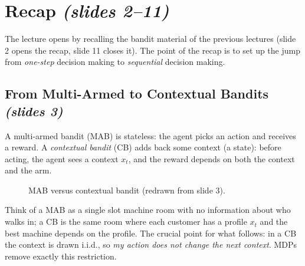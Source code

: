 \documentclass[11pt,a4paper]{article}
\newcommand{\slr}[1]{\texorpdfstring{\emph{(slides #1)}}{(slides #1)}}
\theoremstyle{plain}
\theoremstyle{definition}
\theoremstyle{remark}
\begin{document}
\bigskip

\section{Recap \slr{2--11}}
The lecture opens by recalling the bandit material of the previous lectures (slide 2 opens the recap, slide 11 closes it). The point of the recap is to set up the jump from \emph{one-step} decision making to \emph{sequential} decision making.

\subsection{From Multi-Armed to Contextual Bandits \slr{3}}
A multi-armed bandit (MAB) is stateless: the agent picks an action and receives a reward. A \emph{contextual bandit} (CB) adds back some context (a state): before acting, the agent sees a context $x_t$, and the reward depends on both the context and the arm.

\begin{figure}[htbp]
\centering
{}
\caption{MAB versus contextual bandit (redrawn from slide 3).}
\end{figure}

\begin{intuition}
Think of a MAB as a single slot machine room with no information about who walks in; a CB is the same room where each customer has a profile $x_t$ and the best machine depends on the profile. The crucial point for what follows: in a CB the context is drawn i.i.d., so \emph{my action does not change the next context}. MDPs remove exactly this restriction.
\end{intuition}
\end{document}
